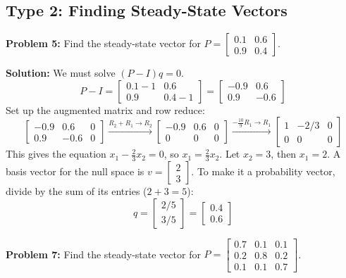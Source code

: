 \documentclass[11pt, letterpaper]{article}
\theoremstyle{definition}
\theoremstyle{remark}
\begin{document}
\subsection{Type 2: Finding Steady-State Vectors}

\textbf{Problem 5:} Find the steady-state vector for $P = \begin{bmatrix} 0.1 & 0.6 \\ 0.9 & 0.4 \end{bmatrix}$.

\textbf{Solution:}
We must solve $(P - I)q = 0$.
\[ P - I = \begin{bmatrix} 0.1 - 1 & 0.6 \\ 0.9 & 0.4 - 1 \end{bmatrix} = \begin{bmatrix} -0.9 & 0.6 \\ 0.9 & -0.6 \end{bmatrix} \]
Set up the augmented matrix and row reduce:
\[ \begin{bmatrix} -0.9 & 0.6 & 0 \\ 0.9 & -0.6 & 0 \end{bmatrix} \xrightarrow{R_2 + R_1 \to R_2} \begin{bmatrix} -0.9 & 0.6 & 0 \\ 0 & 0 & 0 \end{bmatrix} \xrightarrow{-\frac{10}{9}R_1 \to R_1} \begin{bmatrix} 1 & -2/3 & 0 \\ 0 & 0 & 0 \end{bmatrix} \]
This gives the equation $x_1 - \frac{2}{3}x_2 = 0$, so $x_1 = \frac{2}{3}x_2$. Let $x_2 = 3$, then $x_1 = 2$. A basis vector for the null space is $v = \begin{bmatrix} 2 \\ 3 \end{bmatrix}$.
To make it a probability vector, divide by the sum of its entries ($2+3=5$):
\[ q = \begin{bmatrix} 2/5 \\ 3/5 \end{bmatrix} = \begin{bmatrix} 0.4 \\ 0.6 \end{bmatrix} \]

\vspace{1em}
\textbf{Problem 7:} Find the steady-state vector for $P = \begin{bmatrix} 0.7 & 0.1 & 0.1 \\ 0.2 & 0.8 & 0.2 \\ 0.1 & 0.1 & 0.7 \end{bmatrix}$.
\end{document}
